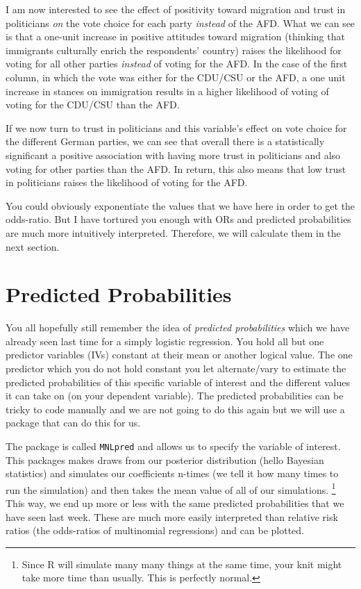 \documentclass[
  letterpaper,
  DIV=11,
  numbers=noendperiod]{scrreprt}
\begin{document}
I am now interested to see the effect of positivity toward migration and
trust in politicians \emph{on} the vote choice for each party
\emph{instead} of the AFD. What we can see is that a one-unit increase
in positive attitudes toward migration (thinking that immigrants
culturally enrich the respondents' country) raises the likelihood for
voting for all other parties \emph{instead} of voting for the AFD. In
the case of the first column, in which the vote was either for the
CDU/CSU or the AFD, a one unit increase in stances on immigration
results in a higher likelihood of voting of voting for the CDU/CSU than
the AFD.

If we now turn to trust in politicians and this variable's effect on
vote choice for the different German parties, we can see that overall
there is a statistically significant a positive association with having
more trust in politicians and also voting for other parties than the
AFD. In return, this also means that low trust in politicians raises the
likelihood of voting for the AFD.

You could obviously exponentiate the values that we have here in order
to get the odds-ratio. But I have tortured you enough with ORs and
predicted probabilities are much more intuitively interpreted.
Therefore, we will calculate them in the next section.

\hypertarget{predicted-probabilities-1}{%
\chapter{Predicted Probabilities}\label{predicted-probabilities-1}}

You all hopefully still remember the idea of \emph{predicted
probabilities} which we have already seen last time for a simply
logistic regression. You hold all but one predictor variables (IVs)
constant at their mean or another logical value. The one predictor which
you do not hold constant you let alternate/vary to estimate the
predicted probabilities of this specific variable of interest and the
different values it can take on (on your dependent variable). The
predicted probabilities can be tricky to code manually and we are not
going to do this again but we will use a package that can do this for
us.

The package is called \texttt{MNLpred} and allows us to specify the
variable of interest. This packages makes draws from our posterior
distribution (hello Bayesian statistics) and simulates our coefficients
n-times (we tell it how many times to run the simulation) and then takes
the mean value of all of our simulations.
\footnote{Since R will simulate many many things at the same time, your knit might take more time than usually. This is perfectly normal.}
This way, we end up more or less with the same predicted probabilities
that we have seen last week. These are much more easily interpreted than
relative risk ratios (the odds-ratios of multinomial regressions) and
can be plotted.
\end{document}
